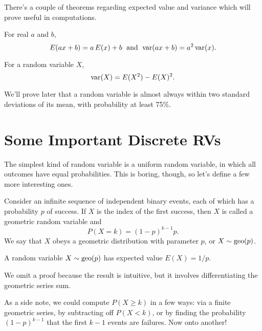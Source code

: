 \documentclass[../m157main.tex]{subfiles}
\begin{document}
There's a couple of theorems regarding expected value and variance which will prove useful in computations.

\begin{theorem}
    For real $a$ and $b$, \vspace{-4pt}
    \[ E(ax + b) = a \,E(x) + b \;\text{ and }\; \textrm{var}(ax + b) = a^2 \,\textrm{var}(x). \]
\end{theorem}

\begin{theorem}
    For a random variable $X$, \vspace{-4pt}
    \[ \textrm{var}(X) = E(X^2) - E(X)^2. \]
\end{theorem}

We'll prove later that a random variable is almost always within two standard deviations of its mean, with probability at least 75\%.

\section{Some Important Discrete RVs}
The simplest kind of random variable is a uniform random variable, in which all outcomes have equal probabilities.
This is boring, though, so let's define a few more interesting ones.

\begin{definition}
    Consider an infinite sequence of independent binary events, each of which has a probability $p$ of success.
    If $X$ is the index of the first success, then $X$ is called a geometric random variable and
    \[ P(X = k) = (1-p)^{k-1} p. \]
    We say that $X$ obeys a geometric distribution with parameter $p$, or $X \sim \textrm{geo}(p)$.
\end{definition}

\begin{theorem}
    A random variable $X \sim \textrm{geo}(p)$ has expected value $E(X) = 1 / p$.
\end{theorem}

We omit a proof because the result is intuitive, but it involves differentiating the geometric series sum.

As a side note, we could compute $P(X \geq k)$ in a few ways: via a finite geometric series, by subtracting off $P(X < k)$, or by finding the probability $(1 - p)^{k-1}$ that the first $k-1$ events are failures.
Now onto another!
\end{document}
